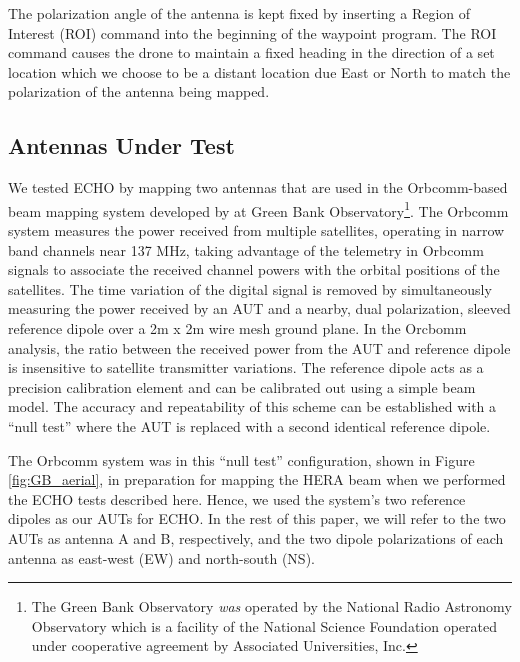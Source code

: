 \documentclass[preprint2,numberedappendix,tighten,twocolappendix]{aastex6}
\begin{document}
The polarization angle of the antenna is kept fixed by inserting a Region of Interest (ROI) command into the beginning of the waypoint program.  The ROI command causes the drone to maintain a fixed heading in the direction of a set location which we choose to be a distant location due East or North to match the polarization of the antenna being mapped.


\subsection{Antennas Under Test}

We tested ECHO by mapping two antennas that are used in the Orbcomm-based beam mapping system developed by \citet{2015RaSc...50..614N,2016:NebenHERAdish} at Green Bank Observatory\footnote{The Green Bank Observatory \emph{was} operated by the National Radio Astronomy Observatory which is a facility of the National Science Foundation operated under cooperative agreement by Associated Universities, Inc.}.  The Orbcomm system measures the power received from multiple satellites, operating in narrow band channels near 137 MHz, taking advantage of the telemetry in Orbcomm signals to associate the received channel powers with the orbital positions of the satellites.   The time variation of the digital signal is removed by simultaneously measuring the power received by an AUT and a nearby, dual polarization, sleeved reference dipole over a 2m x 2m wire mesh ground plane.  In the Orcbomm analysis, the ratio between the received power from the AUT and reference dipole is insensitive to satellite transmitter variations. The reference dipole acts as a precision calibration element and can be calibrated out using a simple beam model.  The accuracy and repeatability of this scheme can be established with a ``null test'' where the AUT is replaced with a second identical reference dipole.  

The Orbcomm system was in this ``null test'' configuration, shown in Figure \ref{fig:GB_aerial}, in preparation for mapping the HERA beam \citep{2016:NebenHERAdish} when we performed the ECHO tests described here.   Hence, we used the system's two reference dipoles as our AUTs for ECHO.  In the rest of this paper, we will refer to the two AUTs as antenna A and B, respectively, and the two dipole polarizations of each antenna as east-west (EW) and north-south (NS).
\end{document}
